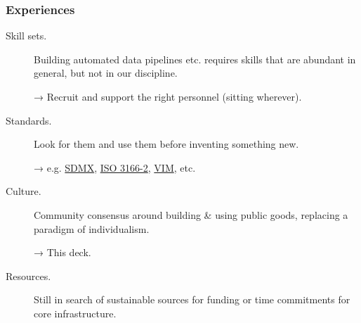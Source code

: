 \documentclass[12pt,aspectratio=169]{beamer}
\begin{document}
\begin{frame}
\frametitle{Experiences}

\begin{description}
  \item [Skill sets.] Building automated data pipelines etc. requires skills that are abundant in general, but not in our discipline.

    → Recruit and support the right personnel (sitting wherever).

  \item [Standards.] Look for them and use them before inventing something new.

    → e.g. \href{https://sdmx.org/?page_id=2555/}{SDMX}, \href{https://en.wikipedia.org/wiki/ISO_3166-2}{ISO 3166-2}, \href{https://www.bipm.org/en/committees/jc/jcgm/publications}{VIM}, etc.

  \item [Culture.] Community consensus around building \& using public goods, replacing a paradigm of individualism.

    → This deck.

  \item [Resources.] Still in search of sustainable sources for funding or time commitments for core infrastructure.
\end{description}

\end{frame}
\end{document}
